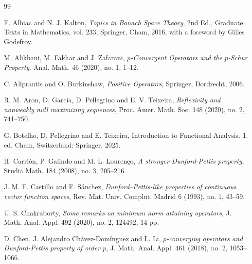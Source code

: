 \documentclass[12 pt]{article}%
\newtheorem{final remark}[theorem]{Final Remark}
\begin{document}
\begin{thebibliography}{99}\small

 F. Albiac and N. J. Kalton, \textit{Topics in Banach Space Theory}, 2nd Ed., Graduate Texts in Mathematics, vol. 233, Springer, Cham, 2016, with a foreword by Gilles Godefroy.

\vspace*{-0.8em}

 M. Alikhani, M.  Fakhar and J. Zafarani, \textit{$p$-Convergent Operators and the $p$-Schur Property}. Anal. Math. 46 (2020), no. 1, 1–12.

\vspace*{-0.8em}

 C. Aliprantis and O. Burkinshaw, \textit{Positive Operators}, Springer, Dordrecht, 2006.

\vspace*{-0.8em}

 R. M. Aron, D. García, D. Pellegrino and E. V. Teixeira, \textit{Reflexivity and nonweakly null maximizing sequences}, Proc. Amer. Math. Soc. 148 (2020), no. 2, 741–750.

\vspace*{-0.8em}

 G. Botelho, D. Pellegrino and E. Teixeira, Introduction to Functional Analysis. 1. ed. Cham, Switzerland: Springer, 2025.

\vspace*{-0.8em}

 H. Carri\'on, P. Galindo and M. L. Louren\c co, \textit{A stronger Dunford-Pettis property}, Studia Math. 184 (2008), no. 3, 205–216.


\vspace*{-0.8em}


 J. M. F. Castillo and F. Sánchez, \textit{Dunford–Pettis-like properties of continuous vector function spaces}, Rev. Mat. Univ. Complut. Madrid 6 (1993), no. 1, 43–59.

\vspace*{-0.8em}

 U. S. Chakraborty, {\it Some remarks on minimum norm attaining operators}, J. Math. Anal. Appl. 492 (2020), no. 2, 124492, 14 pp.

\vspace*{-0.8em}


 D. Chen, J. Alejandro Chávez-Domínguez and L. Li, \textit{$p$-converging operators and Dunford-Pettis property of order $p$}, J. Math. Anal. Appl. 461 (2018), no. 2, 1053–1066.


\end{thebibliography}
\end{document}
